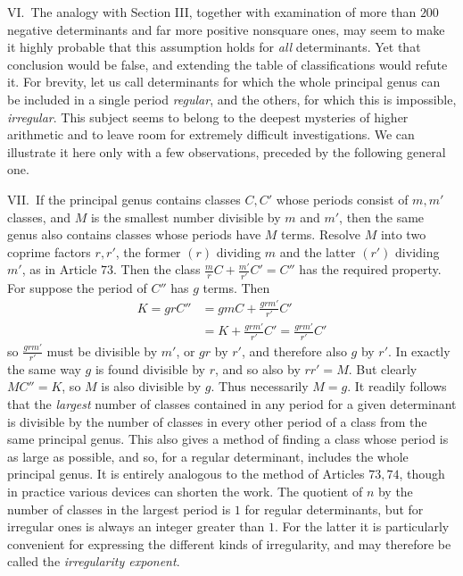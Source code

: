 
VI.\ The analogy with Section III, together with examination of more than \(200\) negative determinants and far more positive nonsquare ones, may seem to make it highly probable that this assumption holds for \textit{all} determinants. Yet that conclusion would be false, and extending the table of classifications would refute it. For brevity, let us call determinants for which the whole principal genus can be included in a single period \textit{regular}, and the others, for which this is impossible, \textit{irregular}. This subject seems to belong to the deepest mysteries of higher arithmetic and to leave room for extremely difficult investigations. We can illustrate it here only with a few observations, preceded by the following general one.

VII.\ If the principal genus contains classes \(C,C'\) whose periods consist of \(m,m'\) classes, and \(M\) is the smallest number divisible by \(m\) and \(m'\), then the same genus also contains classes whose periods have \(M\) terms. Resolve \(M\) into two coprime factors \(r,r'\), the former \((r)\) dividing \(m\) and the latter \((r')\) dividing \(m'\), as in Article \(73\). Then the class \(\frac mrC+\frac{m'}{r'}C'=C''\) has the required property. For suppose the period of \(C''\) has \(g\) terms. Then
\[\begin{aligned}K=grC''&=gmC+\frac{grm'}{r'}C'\\&=K+\frac{grm'}{r'}C'=\frac{grm'}{r'}C'\end{aligned}\]
so \(\frac{grm'}{r'}\) must be divisible by \(m'\), or \(gr\) by \(r'\), and therefore also \(g\) by \(r'\). In exactly the same way \(g\) is found divisible by \(r\), and so also by \(rr'=M\). But clearly \(MC''=K\), so \(M\) is also divisible by \(g\). Thus necessarily \(M=g\). It readily follows that the \textit{largest} number of classes contained in any period for a given determinant is divisible by the number of classes in every other period of a class from the same principal genus. This also gives a method of finding a class whose period is as large as possible, and so, for a regular determinant, includes the whole principal genus. It is entirely analogous to the method of Articles \(73,74\), though in practice various devices can shorten the work. The quotient of \(n\) by the number of classes in the largest period is \(1\) for regular determinants, but for irregular ones is always an integer greater than \(1\). For the latter it is particularly convenient for expressing the different kinds of irregularity, and may therefore be called the \textit{irregularity exponent}.

